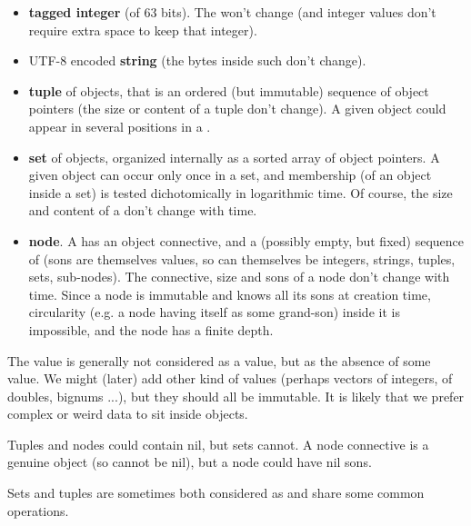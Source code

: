 \begin{itemize}

\item \textbf{tagged integer} (of 63 bits). The  won't change
  (and integer values don't require extra space to keep that integer).
  
\item UTF-8 encoded \textbf{string} (the bytes inside such
   don't change).

  \item \textbf{tuple} of objects, that is an ordered (but immutable)
    sequence of object pointers (the size or content of a tuple don't
    change). A given object could appear in several positions in a
    .

    \item \textbf{set} of objects, organized internally as a sorted
      array of object pointers. A given object can occur only once in
      a set, and membership (of an object inside a set) is tested
      dichotomically in logarithmic time. Of course, the size and
      content of a  don't change with time.

      \item \textbf{node}. A  has an object
        connective, and a (possibly empty, but fixed) sequence of
         (sons are themselves values, so can
        themselves be integers, strings, tuples, sets, sub-nodes). The
        connective, size and sons of a node don't change with
        time. Since a node is immutable and knows all its sons at
        creation time, circularity (e.g. a node having itself as some
        grand-son) inside it is impossible, and the node has a finite
        depth.
        
\end{itemize}

The  value is generally not considered as a
value, but as the absence of some value. We might (later) add other
kind of values (perhaps vectors of integers, of doubles, bignums ...),
but they should all be immutable. It is likely that we prefer complex
or weird data to sit inside objects.

Tuples and nodes could contain nil, but sets cannot. A node connective
is a genuine object (so cannot be nil), but a node could have nil
sons.

Sets and tuples are sometimes both considered as
 and share some common operations.

